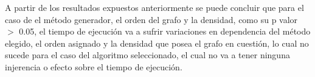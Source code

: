 \documentclass[10pt,a4paper]{article}
\begin{document}
A partir de los resultados expuestos anteriormente se puede concluir que para el caso de el método generador, el orden del grafo y la densidad, como su p valor $>$ 0.05, el tiempo de ejecución va a sufrir variaciones en dependencia del método elegido, el orden asignado y la densidad que posea el grafo en cuestión, lo cual no sucede para el caso del algoritmo seleccionado, el cual no va a tener ninguna injerencia o efecto sobre el tiempo de ejecución.\newpage




\end{document}
